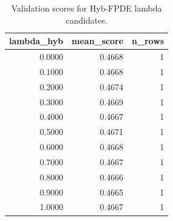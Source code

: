 \begin{table}[t]
\caption{Validation scores for Hyb-FPDE lambda candidates.}
\label{tab:lambda_distribution_computed}
\centering
\begin{tabular}{rrr}
\toprule
lambda\_hyb & mean\_score & n\_rows \\
\midrule
0.0000 & 0.4668 & 1 \\
0.1000 & 0.4668 & 1 \\
0.2000 & 0.4674 & 1 \\
0.3000 & 0.4669 & 1 \\
0.4000 & 0.4667 & 1 \\
0.5000 & 0.4671 & 1 \\
0.6000 & 0.4668 & 1 \\
0.7000 & 0.4667 & 1 \\
0.8000 & 0.4666 & 1 \\
0.9000 & 0.4665 & 1 \\
1.0000 & 0.4667 & 1 \\
\bottomrule
\end{tabular}

\end{table}
